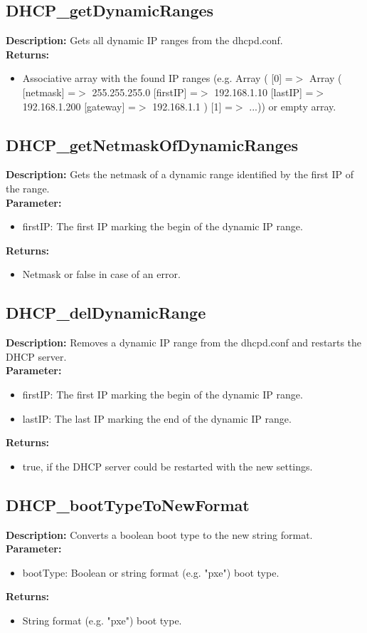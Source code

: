 \subsection{DHCP\_getDynamicRanges}
\textbf{Description:} Gets all dynamic IP ranges from the dhcpd.conf.\\
\textbf{Returns:}
\begin{itemize}
\item Associative array with the found IP ranges (e.g. Array ( [0] =$>$ Array ( [netmask] =$>$ 255.255.255.0 [firstIP] =$>$ 192.168.1.10 [lastIP] =$>$ 192.168.1.200 [gateway] =$>$ 192.168.1.1 ) [1] =$>$ ...)) or empty array.
\end{itemize}

\subsection{DHCP\_getNetmaskOfDynamicRanges}
\textbf{Description:} Gets the netmask of a dynamic range identified by the first IP of the range.\\
\textbf{Parameter:}
\begin{itemize}
\item firstIP: The first IP marking the begin of the dynamic IP range.
\end{itemize}
\textbf{Returns:}
\begin{itemize}
\item Netmask or false in case of an error.
\end{itemize}

\subsection{DHCP\_delDynamicRange}
\textbf{Description:} Removes a dynamic IP range from the dhcpd.conf and restarts the DHCP server.\\
\textbf{Parameter:}
\begin{itemize}
\item firstIP: The first IP marking the begin of the dynamic IP range.
\item lastIP: The last IP marking the end of the dynamic IP range.
\end{itemize}
\textbf{Returns:}
\begin{itemize}
\item true, if the DHCP server could be restarted with the new settings.
\end{itemize}

\subsection{DHCP\_bootTypeToNewFormat}
\textbf{Description:} Converts a boolean boot type to the new string format.\\
\textbf{Parameter:}
\begin{itemize}
\item bootType: Boolean or string format (e.g. "pxe") boot type.
\end{itemize}
\textbf{Returns:}
\begin{itemize}
\item String format (e.g. "pxe") boot type.
\end{itemize}

